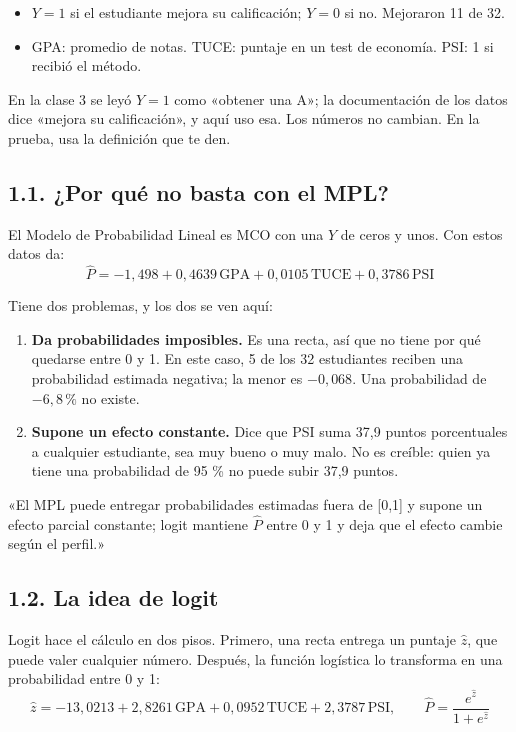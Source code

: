 \documentclass[11pt,letterpaper]{article}
\newcommand{\tema}[1]{\subsection*{#1}}
\newcommand{\Ph}{\hat{P}}
\newcommand{\zh}{\hat{z}}
\begin{document}
\begin{itemize}
  \item $Y=1$ si el estudiante mejora su calificación; $Y=0$ si no. Mejoraron 11 de 32.
  \item GPA: promedio de notas. TUCE: puntaje en un test de economía. PSI: 1 si recibió el método.
\end{itemize}

En la clase 3 se leyó $Y=1$ como «obtener una A»; la documentación de los datos dice «mejora su calificación», y aquí uso esa. Los números no cambian. En la prueba, usa la definición que te den.

\tema{1.1. ¿Por qué no basta con el MPL?}

El Modelo de Probabilidad Lineal es MCO con una $Y$ de ceros y unos. Con estos datos da:
\[
\Ph=-1{,}498+0{,}4639\,\text{GPA}+0{,}0105\,\text{TUCE}+0{,}3786\,\text{PSI}
\]

Tiene dos problemas, y los dos se ven aquí:

\begin{enumerate}
  \item \textbf{Da probabilidades imposibles.} Es una recta, así que no tiene por qué quedarse entre 0 y 1. En este caso, 5 de los 32 estudiantes reciben una probabilidad estimada negativa; la menor es $-0{,}068$. Una probabilidad de $-6{,}8\,\%$ no existe.
  \item \textbf{Supone un efecto constante.} Dice que PSI suma 37,9 puntos porcentuales a cualquier estudiante, sea muy bueno o muy malo. No es creíble: quien ya tiene una probabilidad de 95 \% no puede subir 37,9 puntos.
\end{enumerate}

\begin{frase}
«El MPL puede entregar probabilidades estimadas fuera de [0,1] y supone un efecto parcial constante; logit mantiene $\Ph$ entre 0 y 1 y deja que el efecto cambie según el perfil.»
\end{frase}

\tema{1.2. La idea de logit}

Logit hace el cálculo en dos pisos. Primero, una recta entrega un puntaje $\zh$, que puede valer cualquier número. Después, la función logística lo transforma en una probabilidad entre 0 y 1:
\[
\zh=-13{,}0213+2{,}8261\,\text{GPA}+0{,}0952\,\text{TUCE}+2{,}3787\,\text{PSI},\qquad \Ph=\frac{e^{\zh}}{1+e^{\zh}}
\]

\begin{center}
\end{center}
\end{document}
